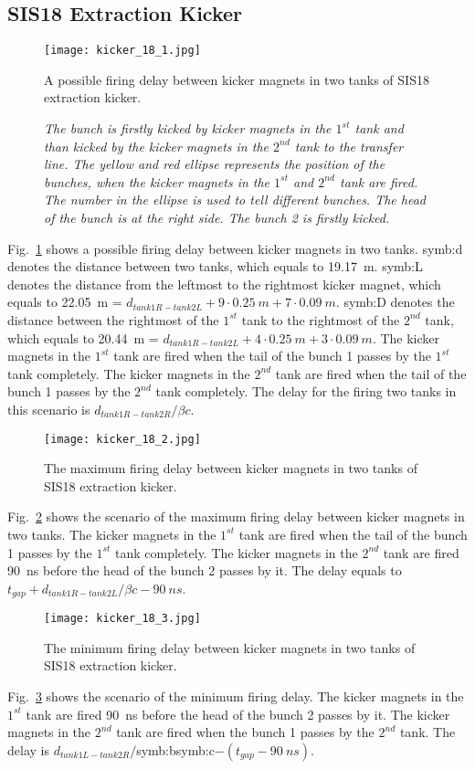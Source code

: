 \subsection{SIS18 Extraction Kicker}
\begin{figure}[H]
   \centering   
   \texttt{[image: kicker\_18\_1.jpg]}
   \caption{A possible firing delay between kicker magnets in two tanks of SIS18 extraction kicker.}
	\caption*{\textsl{\small{The bunch is firstly kicked by kicker magnets in the $1^{st}$ tank and than kicked by the kicker magnets in the $2^{nd}$ tank to the transfer line. The yellow and red ellipse represents the position of the bunches, when the kicker magnets in the $1^{st}$ and $2^{nd}$ tank are fired. The number in the ellipse is used to tell different bunches. The head of the bunch is at the right side. The bunch 2 is firstly kicked. }}}
   \label{kicker_18_1}
\end{figure}
Fig.~\ref{kicker_18_1} shows a possible firing delay between kicker magnets in two tanks. \gls{symb:d} denotes the distance between two tanks, which equals to \SI{19.17}{m}. \gls{symb:L} denotes the distance from the leftmost to the rightmost kicker magnet, which equals to \SI{22.05}{m} = $d_\mathit{tank1R-tank2L} + 9\cdot \SI{0.25}{m} + 7\cdot \SI{0.09}{m}$. \gls{symb:D} denotes the distance between the rightmost of the $1^{st}$ tank to the rightmost of the $2^{nd}$ tank, which equals to \SI{20.44}{m} = $d_\mathit{tank1R-tank2L} + 4\cdot \SI{0.25}{m} + 3\cdot \SI{0.09}{m}$. The kicker magnets in the $1^{st}$ tank are fired when the tail of the bunch 1 passes by the $1^{st}$ tank completely. The kicker magnets in the $2^{nd}$ tank are fired when the tail of the bunch 1 passes by the $2^{nd}$ tank completely. The delay for the firing two tanks in this scenario is $d_\mathit{tank1R-tank2R}/\beta c$. 
\begin{figure}[H]
   \centering   
   \texttt{[image: kicker\_18\_2.jpg]}
   \caption{The maximum firing delay between kicker magnets in two tanks of SIS18 extraction kicker.}
   \label{kicker_18_2}
\end{figure}
Fig.~\ref{kicker_18_2} shows the scenario of the maximum firing delay between kicker magnets in two tanks. The kicker magnets in the $1^{st}$ tank are fired when the tail of the bunch 1 passes by the $1^{st}$ tank completely. The kicker magnets in the $2^{nd}$ tank are fired \SI{90}{ns} before the head of the bunch 2 passes by it. The delay equals to $t_\mathit{gap}+d_\mathit{tank1R-tank2L}/\beta c-\SI{90}{ns}$.
\begin{figure}[H]
   \centering   
   \texttt{[image: kicker\_18\_3.jpg]}
   \caption{The minimum firing delay between kicker magnets in two tanks of SIS18 extraction kicker.}
   \label{kicker_18_3}
\end{figure}
Fig.~\ref{kicker_18_3} shows the scenario of the minimum firing delay. The kicker magnets in the $1^{st}$ tank are fired \SI{90}{ns} before the head of the bunch 2 passes by it. The kicker magnets in the $2^{nd}$ tank are fired when the bunch 1 passes by the $2^{nd}$ tank. The delay is $d_\mathit{tank1L-tank2R}/$\gls{symb:b}\gls{symb:c}$-(t_\mathit{gap}-\SI{90}{ns})$.

